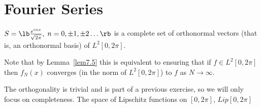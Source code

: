 
\section{Fourier Series}


\bteo 
$S = \lb\frac{e^{inx}}{\sqrt{2\pi}},\;n=0,\pm1,\pm2\ldots\rb$ 
is a complete set of orthonormal vectors 
(that is, an orthonormal basis) of $L^2[0,2\pi]$.
\eteo

Note that by 
Lemma~\ref{lem7.5} 
this is equivalent to ensuring that if $f \in L^2[0,2\pi]$
then $f_N(x)$ converges (in the norm of $L^2[0,2\pi]$) to $f$ as $N\to\infty$.
\espa

\bpru
The orthogonality is trivial and is part of a previous exercise, so we
will only focus on completeness. 
The space of Lipschitz functions on $[0,2\pi]$,
$Lip[0,2\pi]$

